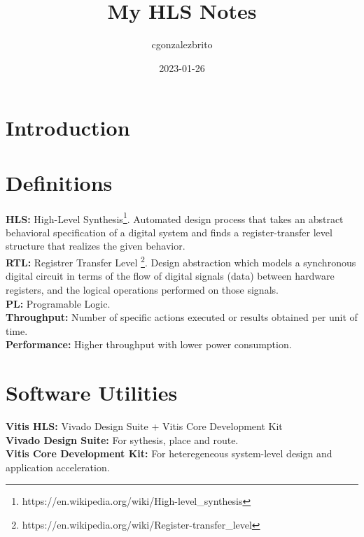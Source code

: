 \documentclass{article}
\title{My HLS Notes}
\date{2023-01-26}
\author{cgonzalezbrito}
\begin{document}
  \maketitle
  \newpage
  \section{Introduction}
  
  \iffalse TODO: \fi

  \newpage
  \section{Definitions}

  \textbf{HLS:} High-Level Synthesis\footnote{\label{HLS}https://en.wikipedia.org/wiki/High-level_synthesis}. Automated design process that takes an abstract behavioral specification of a digital system and finds a register-transfer level structure that realizes the given behavior.\\
  \textbf{RTL:} Registrer Transfer Level \footnote{\label{RTL}https://en.wikipedia.org/wiki/Register-transfer_level}. Design abstraction which models a synchronous digital circuit in terms of the flow of digital signals (data) between hardware registers, and the logical operations performed on those signals.\\
  \textbf{PL:} Programable Logic.\\
  \textbf{Throughput:} Number of specific actions executed or results obtained per unit of time.\\
  \textbf{Performance:} Higher throughput with lower power consumption.\\

  \section{Software Utilities}

  \textbf{Vitis HLS:} Vivado Design Suite + Vitis Core Development Kit\\
  \textbf{Vivado Design Suite:} For sythesis, place and route.\\
  \textbf{Vitis Core Development Kit:} For heteregeneous system-level design and application acceleration.\\
\end{document}
